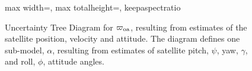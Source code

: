 \begin{figure}[p]
\begin{adjustbox}{max width=\textwidth, max totalheight=\textheight, keepaspectratio}
  \end{adjustbox}
  \caption{Uncertainty Tree Diagram for $\varpi_{\rm oa}$, resulting from estimates of the satellite position, velocity and attitude. The diagram defines one sub-model, $\alpha$, resulting from estimates of satellite pitch, $\psi$, yaw, $\gamma$, and roll, $\phi$, attitude angles.}
  \label{fig:utd_varpi_oa}
\end{figure}
